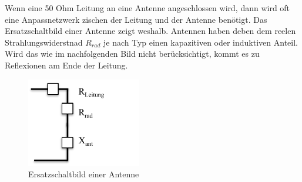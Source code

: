 Wenn eine 50 Ohm Leitung an eine Antenne angeschlossen wird, dann wird oft eine Anpassnetzwerk zischen der Leitung und der Antenne benötigt. Das Ersatzschaltbild einer Antenne zeigt weshalb. Antennen haben deben dem reelen Strahlungswiderstnad $R_{rad}$ je nach Typ einen kapazitiven oder induktiven Anteil. Wird das wie im nachfolgenden Bild nicht berücksichtigt, kommt es zu Reflexionen am Ende der Leitung.\\
\begin{figure}[!htb]
	\centering
	\includegraphics[width=5cm]{content/bilder/ESB_Antenne.pdf}%
	\caption{Ersatzschaltbild einer Antenne}
	\label{ESBantenne}
\end{figure}

